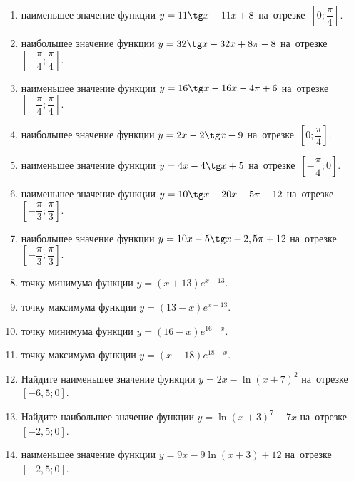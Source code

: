 \documentclass[a4paper,10pt]{article}
\begin{document}
\begin{enumerate}
\item {} наименьшее значение функции $y=11\tg x-11x+8$ на~отрезке~$\left[0;\dfrac{\pi }{4}\right]$.

\item {} наибольшее значение функции $y=32\tg x-32x+8\pi -8$ на~отрезке~$\left[-\dfrac{\pi }{4};\dfrac{\pi }{4}\right]$.

\item {} наименьшее значение функции $y=16\tg x-16x-4\pi +6$ на~отрезке~$\left[-\dfrac{\pi }{4};\dfrac{\pi }{4}\right]$.

\item {} наибольшее значение функции $y=2x-2\tg x-9$ на~отрезке~$\left[0;\dfrac{\pi }{4}\right]$.

\item {} наименьшее значение функции $y=4x-4\tg x+5$ на~отрезке~$\left[-\dfrac{\pi }{4};0\right]$.

\item {} наименьшее значение функции $y=10\tg x-20x+5\pi -12$ на~отрезке~$\left[-\dfrac{\pi }{3};\dfrac{\pi }{3}\right]$.

\item {} наибольшее значение функции $y=10x-5\tg x-2,5\pi +12$ на~отрезке~$\left[-\dfrac{\pi }{3};\dfrac{\pi }{3}\right]$.

\item {} точку минимума функции $y=\left(x+13\right)e^{x-13}$.

\item {} точку максимума функции $y=\left(13-x\right)e^{x+13}$.

\item {} точку минимума функции $y=\left(16-x\right)e^{16-x}$.

\item {} точку максимума функции $y=\left(x+18\right)e^{18-x}$.

\item Найдите наименьшее значение функции $y=2x-\ln \left(x+7\right)^2$ на~отрезке~$\left[-6,5;0\right]$.

\item Найдите наибольшее значение функции $y=\ln \left(x+3\right)^7-7x$ на~отрезке~$\left[-2,5;0\right]$.

\item {} наименьшее значение функции $y=9x-9\ln \left(x+3\right)+12$ на~отрезке~$\left[-2,5;0\right]$.


\end{enumerate}
\end{document}
